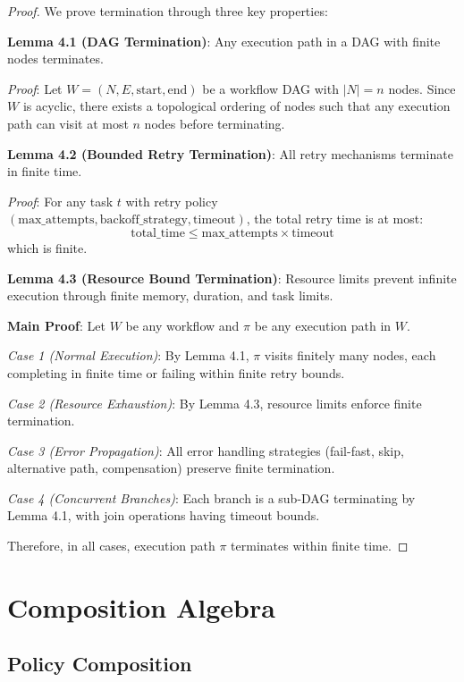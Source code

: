 \begin{proof}
We prove termination through three key properties:

\textbf{Lemma 4.1 (DAG Termination)}: Any execution path in a DAG with finite nodes terminates.

\emph{Proof}: Let $W = (N, E, \text{start}, \text{end})$ be a workflow DAG with $|N| = n$ nodes. Since $W$ is acyclic, there exists a topological ordering of nodes such that any execution path can visit at most $n$ nodes before terminating.

\textbf{Lemma 4.2 (Bounded Retry Termination)}: All retry mechanisms terminate in finite time.

\emph{Proof}: For any task $t$ with retry policy $(\text{max\_attempts}, \text{backoff\_strategy}, \text{timeout})$, the total retry time is at most:
\begin{equation}
\text{total\_time} \leq \text{max\_attempts} \times \text{timeout}
\end{equation}
which is finite.

\textbf{Lemma 4.3 (Resource Bound Termination)}: Resource limits prevent infinite execution through finite memory, duration, and task limits.

\textbf{Main Proof}: Let $W$ be any workflow and $\pi$ be any execution path in $W$.

\emph{Case 1 (Normal Execution)}: By Lemma 4.1, $\pi$ visits finitely many nodes, each completing in finite time or failing within finite retry bounds.

\emph{Case 2 (Resource Exhaustion)}: By Lemma 4.3, resource limits enforce finite termination.

\emph{Case 3 (Error Propagation)}: All error handling strategies (fail-fast, skip, alternative path, compensation) preserve finite termination.

\emph{Case 4 (Concurrent Branches)}: Each branch is a sub-DAG terminating by Lemma 4.1, with join operations having timeout bounds.

Therefore, in all cases, execution path $\pi$ terminates within finite time.
\end{proof}

\newpage

\section{Composition Algebra}

\subsection{Policy Composition}

